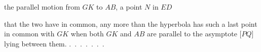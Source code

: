 %
the parallel motion from $GK$ to $AB$, a  point $N$ in $ED$
\begin{center}\end{center}
\noindent that the two have in common, any more than the hyperbola has such a last point in common with $GK$ when both $GK$ and $AB$ are parallel to the asymptote [$PQ$] lying between them. \mbox{.\ .\ .\ .\ .\ .\ .}
